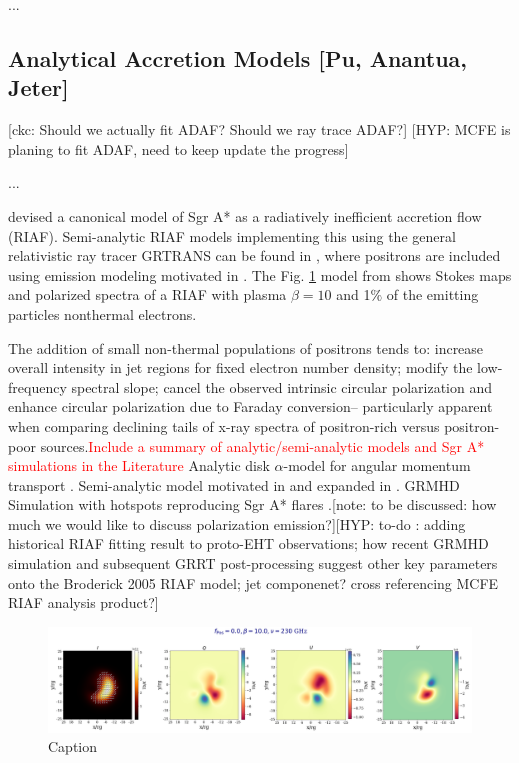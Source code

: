 \documentclass[twocolumn,tighten,dvipsnames,linenumbers]{aastex63}
\newcommand\note[1]{{\color{OliveGreen}[note: #1]}}
\newcommand\ckc[1]{{\color{MidnightBlue}[ckc: #1]}}
\newcommand\hyp[1]{{\color{Salmon}[HYP: #1]}}
\begin{document}
...

\subsection{Analytical Accretion Models
  [Pu, Anantua, Jeter]}
\label{sec:anamodels}

\ckc{Should we actually fit ADAF?
  Should we ray trace ADAF?}
\hyp{MCFE is planing to fit ADAF, need to keep update the progress}

...

\cite{Broderick2005} devised a canonical model of Sgr A* as a  radiatively inefficient accretion flow (RIAF). Semi-analytic RIAF models implementing  this using the general relativistic ray tracer GRTRANS \citep{2016MNRAS.462..115D} can be found in  \cite{Emami2021}, where  positrons are included using emission modeling motivated in  \cite{Anantua:2019bna}. The Fig. \ref{fig:EmamiRIAF} model from \cite{Emami2021}  shows Stokes maps and polarized spectra of a \cite{Broderick2005} RIAF with plasma $\beta=10$ and 1$\%$ of the emitting particles nonthermal electrons.


The addition of small non-thermal populations of positrons \cite{Emami2021} tends to: increase overall intensity in jet regions for fixed electron number density; modify the low-frequency spectral slope; cancel the observed intrinsic circular polarization and enhance circular polarization due to Faraday conversion-- particularly apparent when comparing declining tails of x-ray spectra of positron-rich versus positron-poor sources.\textcolor{red}{Include a summary of analytic/semi-analytic models and Sgr A* simulations in the Literature} Analytic disk $\alpha$-model for angular momentum transport \cite{Shakura1973}. Semi-analytic model motivated in \cite{Yuan2003} and expanded in \cite{Broderick2011}. GRMHD Simulation with hotspots reproducing Sgr A* flares \cite{Ripperda2020}.\note{to be discussed: how much we would like to discuss polarization emission?}\hyp{to-do :  adding historical RIAF fitting result to proto-EHT observations; how recent  GRMHD simulation and subsequent GRRT post-processing suggest other key parameters onto the Broderick 2005 RIAF model; jet componenet? cross referencing MCFE RIAF analysis product?}


\begin{figure}[H]
  \includegraphics[width=.55\textwidth,height=25mm%
]{RIAFSgrAPlaneTscl1Pt5e11beta1Pt0e01fpos0Pt0fNTH1Pt0e-02copy}
  \caption{Caption}
  \label{fig:EmamiRIAF}
\end{figure}
\end{document}
